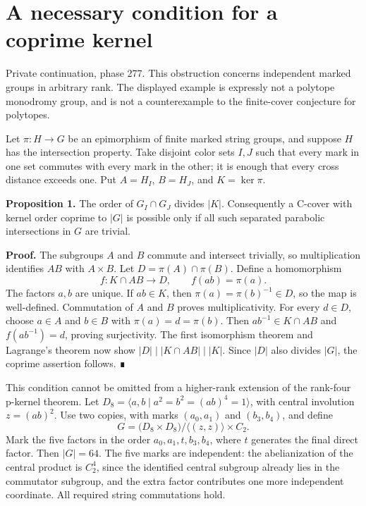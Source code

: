\documentclass[
  11pt,
  a4paper,
]{article}
\author{}
\date{}
\begin{document}
\section{A necessary condition for a coprime
kernel}\label{a-necessary-condition-for-a-coprime-kernel}

Private continuation, phase 277. This obstruction concerns independent
marked groups in arbitrary rank. The displayed example is expressly not
a polytope monodromy group, and is not a counterexample to the
finite-cover conjecture for polytopes.

Let \(\pi:H\to G\) be an epimorphism of finite marked string groups, and
suppose \(H\) has the intersection property. Take disjoint color sets
\(I,J\) such that every mark in one set commutes with every mark in the
other; it is enough that every cross distance exceeds one. Put
\(A=H_I\), \(B=H_J\), and \(K=\ker\pi\).

\textbf{Proposition 1.} The order of \(G_I\cap G_J\) divides \(|K|\).
Consequently a C-cover with kernel order coprime to \(|G|\) is possible
only if all such separated parabolic intersections in \(G\) are trivial.

\textbf{Proof.} The subgroups \(A\) and \(B\) commute and intersect
trivially, so multiplication identifies \(AB\) with \(A\times B\). Let
\(D=\pi(A)\cap\pi(B)\). Define a homomorphism \[
 f:K\cap AB\longrightarrow D,\qquad f(ab)=\pi(a).
\] The factors \(a,b\) are unique. If \(ab\in K\), then
\(\pi(a)=\pi(b)^{-1}\in D\), so the map is well-defined. Commutation of
\(A\) and \(B\) proves multiplicativity. For every \(d\in D\), choose
\(a\in A\) and \(b\in B\) with \(\pi(a)=d=\pi(b)\). Then
\(ab^{-1}\in K\cap AB\) and \(f(ab^{-1})=d\), proving surjectivity. The
first isomorphism theorem and Lagrange's theorem now show
\(|D|\mid|K\cap AB|\mid|K|\). Since \(|D|\) also divides \(|G|\), the
coprime assertion follows. ∎

This condition cannot be omitted from a higher-rank extension of the
rank-four p-kernel theorem. Let
\(D_8=\langle a,b\mid a^2=b^2=(ab)^4=1\rangle\), with central involution
\(z=(ab)^2\). Use two copies, with marks \((a_0,a_1)\) and
\((b_3,b_4)\), and define \[
 G=\bigl(D_8\times D_8\bigr)/\langle(z,z)\rangle\times C_2.
\] Mark the five factors in the order \(a_0,a_1,t,b_3,b_4\), where \(t\)
generates the final direct factor. Then \(|G|=64\). The five marks are
independent: the abelianization of the central product is \(C_2^4\),
since the identified central subgroup already lies in the commutator
subgroup, and the extra factor contributes one more independent
coordinate. All required string commutations hold.
\end{document}
